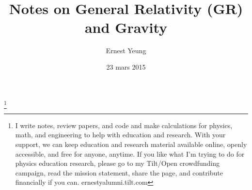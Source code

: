 \documentclass[10pt, twoside]{amsart}
\begin{document}

\title[GR]{Notes on General Relativity (GR) and Gravity}
\author{Ernest Yeung}
\address{}
\thanks{I write notes, review papers, and code and make calculations for physics, math, and engineering to help with education and research. With your support, we can keep education and research material available online, openly accessible, and free for anyone, anytime. If you like what I'm trying to do for physics education research, please go to my Tilt/Open crowdfunding campaign, read the mission statement, share the page, and contribute financially if you can. ernestyalumni.tilt.com }
\date{23 mars 2015}
\end{document}
